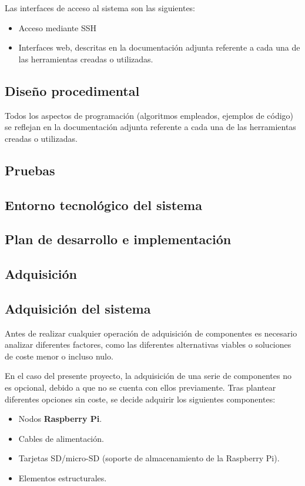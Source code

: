 Las interfaces de acceso al sistema son las siguientes:

\begin{itemize}
\item Acceso mediante SSH
\item Interfaces web, descritas en la documentación adjunta referente a cada una de las herramientas creadas o utilizadas.
\end{itemize}
\subsection{Diseño procedimental}

Todos los aspectos de programación (algoritmos empleados, ejemplos de código) se reflejan en la documentación adjunta referente a cada una de las herramientas creadas o utilizadas.

\subsection{Pruebas}
\citationneeded[]
\subsection{Entorno tecnológico del sistema}
\subsection{Plan de desarrollo e implementación}
\subsection{Adquisición}
\label{adquisicion}


\subsection{Adquisición del sistema}

Antes de realizar cualquier operación de adquisición de componentes es necesario analizar diferentes factores, como las diferentes alternativas viables o soluciones de coste menor o incluso nulo.

En el caso del presente proyecto, la adquisición de una serie de componentes no es opcional, debido a que no se cuenta con ellos previamente. Tras plantear diferentes opciones sin coste, se decide adquirir los siguientes componentes:

\begin{itemize}
  \item Nodos \textbf{Raspberry Pi}.
  \item Cables de alimentación.
  \item Tarjetas SD/micro-SD (soporte de almacenamiento de la Raspberry Pi).
  \item Elementos estructurales.
\end{itemize}

